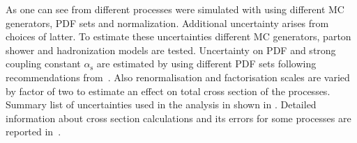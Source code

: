 As one can see from  different processes were simulated with using different MC generators, PDF sets and normalization.
Additional uncertainty arises from choices of latter.
To estimate these uncertainties different MC generators, parton shower and hadronization models are tested.
Uncertainty on PDF and strong coupling constant $\alpha_{\mathrm{s}}$ are estimated by using different PDF sets following recommendations from~\cite{pdf4lhc}.
Also renormalisation and factorisation scales are varied by factor of two to estimate an effect on total cross section of the processes.
Summary list of uncertainties used in the analysis in shown in .
Detailed information about cross section calculations and its errors for some processes 
are reported in~\cite{diboson_cross_section,ttW_cross_section,ttV_cross_section}.





